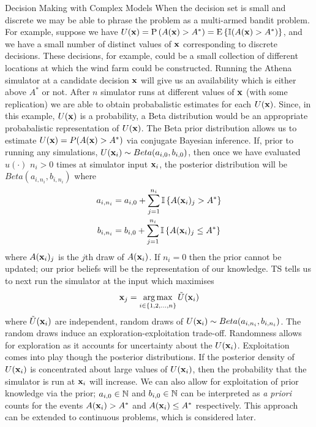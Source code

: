 \begin{chapter}{Decision Making with Complex Models \label{Chap:optimisation}}
When the decision set is small and discrete we may be able to phrase the problem as a multi-armed bandit problem. For example, suppose we have $U(\mathbf{x}) = \mathrm{P}\, (A(\mathbf{x}) > A^{*}) = \textrm{E}\, \{\mathbb{I}(A(\mathbf{x}) > A^{*}) \} $, and we have a small number of distinct values of $\mathbf{x}$ corresponding to discrete decisions. These decisions, for example, could be a small collection of different locations at which the wind farm could be constructed. Running the Athena simulator at a candidate decision $\mathbf{x}$ will give us an availability which is either above $A^{*}$ or not. After $n$ simulator runs at different values of $\mathbf{x}$ (with some replication) we are able to obtain probabalistic estimates for each $U(\mathbf{x})$. Since, in this example, $U(\mathbf{x})$ is a probability, a Beta distribution would be an appropriate probabalistic representation of $U(\mathbf{x})$. The Beta prior distribution allows us to estimate $U(\mathbf{x}) = P(A(\mathbf{x}) > A^{*})$ via conjugate Bayesian inference. If, prior to running any simulations, $U(\mathbf{x}_i) \sim Beta(a_{i,0}, b_{i,0})$, then once we have evaluated $u(\cdot)$ $n_i > 0$ times at simulator input $\mathbf{x}_i$, the posterior distribution will be $Beta(a_{i,n_i}, b_{i, n_i})$ where
\begin{align}
 a_{i, n_i} & = a_{i, 0} + \sum_{j = 1}^{n_i} \mathbb{I} \left\{ A(\mathbf{x}_i)_j > A^{*} \right\} \nonumber\\
 b_{i, n_i} & = b_{i, 0} + \sum_{j = 1}^{n_i} \mathbb{I} \left\{ A(\mathbf{x}_i)_j \leq A^{*} \right\}\nonumber
\end{align}
where $A(\mathbf{x}_i)_j$ is the $j$th draw of $A(\mathbf{x}_i)$. If $n_i = 0$ then the prior cannot be updated; our prior beliefs will be the representation of our knowledge. TS tells us to next run the simulator at the input which maximises
\begin{equation}
 \mathbf{x}_j = \operatorname*{arg\,max}_{i \in \{1, 2, \ldots, n \} } \tilde{U}(\mathbf{x}_i)
\end{equation}
where $\tilde{U}(\mathbf{x}_i)$ are independent, random draws of $U(\mathbf{x}_i) \sim Beta(a_{i, n_i}, b_{i, n_i})$. The random draws induce an exploration-exploitation trade-off. Randomness allows for exploration as it accounts for uncertainty about the $U(\mathbf{x}_i)$. Exploitation comes into play though the posterior distributions. If the posterior density of $U(\mathbf{x}_i)$ is concentrated about large values of $U(\mathbf{x}_i)$, then the probability that the simulator is run at $\mathbf{x}_i$ will increase. We can also allow for exploitation of prior knowledge via the prior; $a_{i,0} \in \mathbb{N}$ and $b_{i,0} \in \mathbb{N}$ can be interpreted as \textit{a priori} counts for the events $A(\mathbf{x}_i) > A^{*}$ and $A(\mathbf{x}_i) \leq A^{*}$ respectively. This approach can be extended to continuous problems, which is considered later.

\end{chapter}
